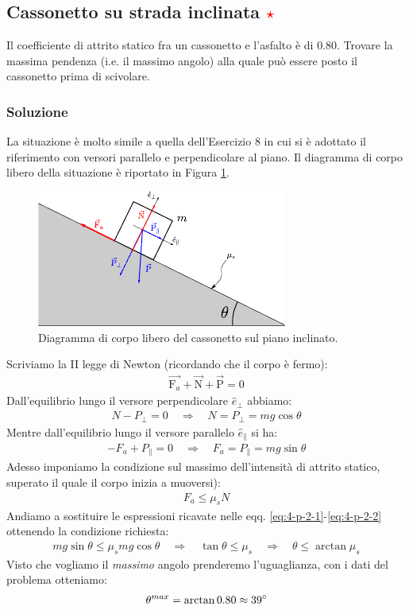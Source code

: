 \documentclass[12pt,a4paper]{book}
\newcommand{\rstar}{ \textcolor{red}{$\star$}}
\begin{document}
\subsection{Cassonetto su strada inclinata \rstar}
Il coefficiente di attrito statico fra un cassonetto e l'asfalto è di 0.80. Trovare la massima pendenza (i.e. il massimo angolo) alla quale può essere posto il cassonetto prima di scivolare.

\subsubsection*{Soluzione}
La situazione è molto simile a quella dell'Esercizio 8 in cui si è adottato il riferimento con versori parallelo e perpendicolare al piano. Il diagramma di corpo libero della situazione è riportato in Figura \ref{fig:4-p-2}.

\begin{figure}[!ht]
\centering
\includegraphics[scale=2]{p-2.pdf}
\caption{Diagramma di corpo libero del cassonetto sul piano inclinato.} 
\label{fig:4-p-2} 
\end{figure}

Scriviamo la II legge di Newton (ricordando che il corpo è fermo):
%
\begin{gather*}
\vec{\text{F}_a}+\vec{\text{N}}+\vec{\text{P}}=0
\end{gather*}
%
Dall'equilibrio lungo il versore perpendicolare $\hat{e}_\perp$ abbiamo:
%
\begin{gather}
N-P_\perp=0 \quad	\Longrightarrow \quad N=P_\perp=mg\cos\theta
\label{eq:4-p-2-1}
\end{gather}
%
Mentre dall'equilibrio lungo il versore parallelo $\hat{e}_\parallel$ si ha:
%
\begin{gather}
-F_a+P_\parallel=0 \quad \Longrightarrow \quad F_a=P_\parallel=mg\sin\theta
\label{eq:4-p-2-2}
\end{gather}
%
Adesso imponiamo la condizione sul massimo dell'intensità di attrito statico, superato il quale  il corpo inizia a muoversi):
%
\begin{gather*}
F_a\leq\mu_sN
\end{gather*}
%
Andiamo a sostituire le espressioni ricavate nelle eqq. \ref{eq:4-p-2-1}-\ref{eq:4-p-2-2} ottenendo la condizione richiesta:
%
\begin{gather*}
mg\sin\theta \leq \mu_s mg\cos\theta \quad \Longrightarrow \quad \tan\theta \leq \mu_s \quad \Longrightarrow \quad \theta \leq \arctan\mu_s
\end{gather*}
%
Visto che vogliamo il \textit{massimo} angolo prenderemo l'uguaglianza, con i dati del problema otteniamo:
%
\begin{gather*}
\theta^{max} = \arctan 0.80 \approx 39 \degree
\end{gather*}
%
\end{document}
